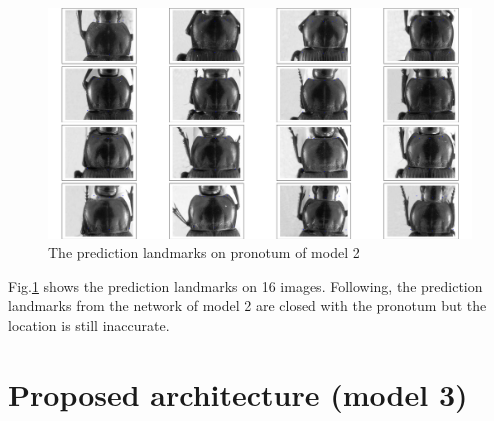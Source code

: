 \begin{figure}[h!]
	\centering
	\includegraphics[scale=0.25]{images/figure_1_celia}
	\caption{The prediction landmarks on pronotum of model 2}
	\label{model2pt}
\end{figure}
Fig.\ref{model2pt} shows the prediction landmarks on 16 images. Following, the prediction landmarks from the network of model 2 are closed with the pronotum but the location is still inaccurate.

\section{Proposed architecture (model 3)}
